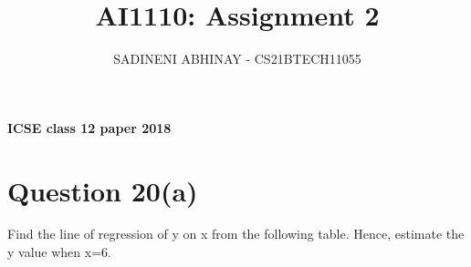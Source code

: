 \documentclass[journal,12pt,twocolumn]{IEEEtran}
\begin{document}
\let\StandardTheFigure\thefigure
\let\vec\mathbf
\renewcommand{\thefigure}{\theproblem}
	
	
	
	\def\putbox#1#2#3{\makebox[0in][l]{\makebox[#1][l]{}\raisebox{\baselineskip}[0in][0in]{\raisebox{#2}[0in][0in]{#3}}}}
	\def\rightbox#1{\makebox[0in][r]{#1}}
	\def\centbox#1{\makebox[0in]{#1}}
	\def\topbox#1{\raisebox{-\baselineskip}[0in][0in]{#1}}
	\def\midbox#1{\raisebox{-0.5\baselineskip}[0in][0in]{#1}}
	
	\vspace{3cm}
	\title{
		AI1110: Assignment 2
	}
	\author{ 
		SADINENI ABHINAY - CS21BTECH11055
	}	
    \maketitle

	\textbf{ICSE class 12 paper 2018}
	\section{Question 20(a)} 
Find the line of regression of y on x from the following table.
Hence, estimate the y value when x=6.
\begin{table}[!htb]
	\centering
	
	\caption{}
	\label{table:Table}
\end{table} 
\end{document}
